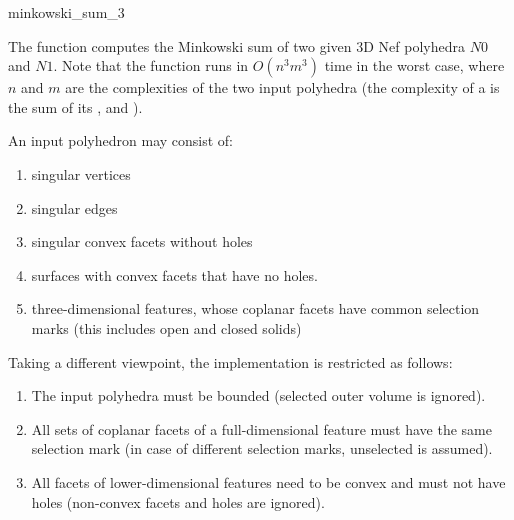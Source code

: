 
\ccHtmlNoClassLinks
\begin{ccRefFunction}{minkowski_sum_3}
\label{refminkowski_sum_3}

\ccDefinition

The function  computes the Minkowski sum of two
given 3D Nef polyhedra $N0$ and $N1$. Note that the function runs in
$O(n^3m^3)$ time in the worst case, where $n$ and
$m$ are the complexities of the two input polyhedra (the complexity of
a  is the sum of its ,
 and ).


\ccPrecond

An input polyhedron may consist of:
\begin{enumerate}
\item singular vertices
\item singular edges
\item singular convex facets without holes
\item surfaces with convex facets that have no holes.
\item three-dimensional features, whose coplanar facets have
common selection marks (this includes open and closed solids)
\end{enumerate}

Taking a different viewpoint, the implementation is restricted as
follows:
\begin{enumerate}
\item The input polyhedra must be bounded (selected outer volume is ignored).
\item All sets of coplanar facets of a full-dimensional
feature must have the same selection mark (in case of different
selection marks, unselected is assumed).
\item All facets of lower-dimensional features need to be convex and 
must not have holes (non-convex facets and holes are ignored).
\end{enumerate}


\ccSeeAlso
{}\\ 
\\ 

\end{ccRefFunction}
